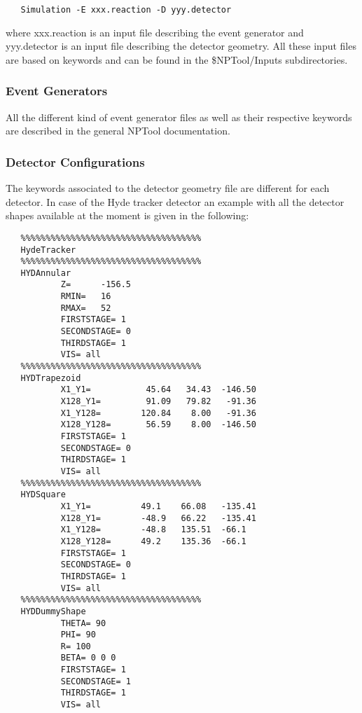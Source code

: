 \documentclass[a4paper,12pt]{article}
\begin{document}
\begin{verbatim}
   Simulation -E xxx.reaction -D yyy.detector
\end{verbatim}

where xxx.reaction is an input file describing the event generator and
yyy.detector is an input file describing the detector geometry. All these
input files are based on keywords and can be found in the 
\$NPTool/Inputs subdirectories.

\subsubsection{Event Generators}
All the different kind of event generator files as well as their 
respective keywords are described in the general NPTool documentation. 

\subsubsection{Detector Configurations}
The keywords associated to the detector geometry file are different for 
each detector. In case of the Hyde tracker detector an example with 
all the detector shapes available at the moment is given in the following:

\begin{verbatim}
   %%%%%%%%%%%%%%%%%%%%%%%%%%%%%%%%%%%%
   HydeTracker
   %%%%%%%%%%%%%%%%%%%%%%%%%%%%%%%%%%%%
   HYDAnnular
           Z=      -156.5
           RMIN=   16
           RMAX=   52
           FIRSTSTAGE= 1
           SECONDSTAGE= 0
           THIRDSTAGE= 1
           VIS= all
   %%%%%%%%%%%%%%%%%%%%%%%%%%%%%%%%%%%%
   HYDTrapezoid
           X1_Y1=           45.64   34.43  -146.50
           X128_Y1=         91.09   79.82   -91.36
           X1_Y128=        120.84    8.00   -91.36
           X128_Y128=       56.59    8.00  -146.50
           FIRSTSTAGE= 1
           SECONDSTAGE= 0
           THIRDSTAGE= 1
           VIS= all
   %%%%%%%%%%%%%%%%%%%%%%%%%%%%%%%%%%%%
   HYDSquare
           X1_Y1=          49.1    66.08   -135.41
           X128_Y1=        -48.9   66.22   -135.41
           X1_Y128=        -48.8   135.51  -66.1
           X128_Y128=      49.2    135.36  -66.1
           FIRSTSTAGE= 1
           SECONDSTAGE= 0
           THIRDSTAGE= 1
           VIS= all
   %%%%%%%%%%%%%%%%%%%%%%%%%%%%%%%%%%%%
   HYDDummyShape
           THETA= 90
           PHI= 90
           R= 100
           BETA= 0 0 0
           FIRSTSTAGE= 1
           SECONDSTAGE= 1
           THIRDSTAGE= 1
           VIS= all
\end{verbatim}
\end{document}
